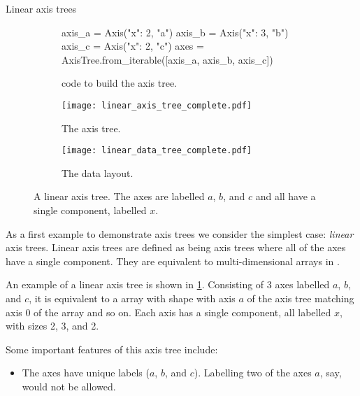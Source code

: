 \documentclass[thesis]{subfiles}
\begin{document}
\begin{example}{Linear axis trees}

\begin{figure}
  \centering
  \begin{subfigure}{.9\textwidth}
    \begin{pyalg2}
      axis_a = Axis({"x": 2}, "a")
      axis_b = Axis({"x": 3}, "b")
      axis_c = Axis({"x": 2}, "c")
      axes = AxisTree.from_iterable([axis_a, axis_b, axis_c])
    \end{pyalg2}
    \caption{ code to build the axis tree.}
  \end{subfigure}

  \vspace{1em}

  \begin{subfigure}[t]{.3\textwidth}
    \centering
    \texttt{[image: linear\_axis\_tree\_complete.pdf]}
    \caption{The axis tree.}
  \end{subfigure}
  \begin{subfigure}[t]{.3\textwidth}
    \centering
    \texttt{[image: linear\_data\_tree\_complete.pdf]}
    \caption{The data layout.}
  \end{subfigure}
  \caption{
    A linear axis tree.
    The axes are labelled $a$, $b$, and $c$ and all have a single component, labelled $x$.
  }
  \label{fig:linear_axis_tree}
\end{figure}

As a first example to demonstrate axis trees we consider the simplest case: \emph{linear} axis trees.
Linear axis trees are defined as being axis trees where all of the axes have a single component.
They are equivalent to multi-dimensional arrays in \numpy.

An example of a linear axis tree is shown in \cref{fig:linear_axis_tree}.
Consisting of 3 axes labelled $a$, $b$, and $c$, it is equivalent to a \numpy array with shape  with axis $a$ of the axis tree matching axis 0 of the \numpy array and so on.
Each axis has a single component, all labelled $x$, with sizes 2, 3, and 2.

Some important features of this axis tree include:

\begin{itemize}
  \item
    The axes have unique labels ($a$, $b$, and $c$).
    Labelling two of the axes $a$, say, would not be allowed.


\end{itemize}
\end{example}
\end{document}
